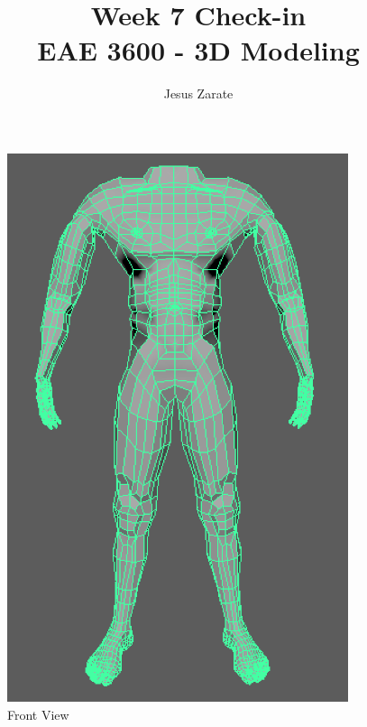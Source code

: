 \documentclass[a4paper]{article}
\title{
  Week 7 Check-in\\
  \large EAE 3600 - 3D Modeling}
\author{Jesus Zarate}
\begin{document}
\maketitle


\begin{figure}[h]
\centering
\includegraphics[width=10cm]{img/Front.png}
\caption{Front View}
\label{fig:Front View}
\end{figure}
\end{document}
